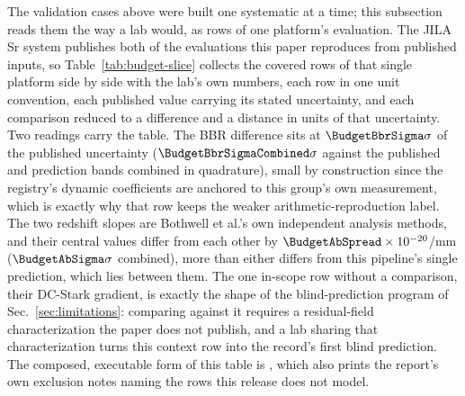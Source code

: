 \documentclass[aps,pra,superscriptaddress,groupedaddress,nofootinbib]{revtex4-2}
\begin{document}
The validation cases above were built one systematic at a time; this
subsection reads them the way a lab would, as rows of one platform's
evaluation. The JILA Sr system publishes both of the evaluations this
paper reproduces from published inputs, so Table~\ref{tab:budget-slice}
collects the covered rows of that single platform side by side with
the lab's own numbers, each row in one unit convention, each published
value carrying its stated uncertainty, and each comparison reduced to
a difference and a distance in units of that uncertainty. Two readings
carry the table. The BBR difference sits at $\BudgetBbrSigma\sigma$ of
the published uncertainty ($\BudgetBbrSigmaCombined\sigma$ against the
published and prediction bands combined in quadrature), small by
construction since the registry's
dynamic coefficients are anchored to this group's own measurement,
which is exactly why that row keeps the weaker arithmetic-reproduction
label. The two redshift slopes are Bothwell et al.'s own independent
analysis methods, and their central values differ from each other by
$\BudgetAbSpread\times10^{-20}$/mm ($\BudgetAbSigma\sigma$ combined),
more than either differs from this pipeline's single prediction, which
lies between them. The one in-scope row without a comparison, their
DC-Stark gradient, is exactly the shape of the blind-prediction
program of Sec.~\ref{sec:limitations}: comparing against it requires a
residual-field characterization the paper does not publish, and a lab
sharing that characterization turns this context row into the record's
first blind prediction. The composed, executable form of this table is
, which also prints the
report's own exclusion notes naming the rows this release does not
model.

\begin{table}[htbp]
\centering
\caption{The covered slice of one platform's published evaluation (the
JILA Sr system: Aeppli et al.~\cite{Aeppli2024}, Bothwell et
al.~\cite{Bothwell2022}), computed from published inputs by the same
case objects the benchmark suite commits. $\sigma$ is the difference in
units of the published value's stated uncertainty, a conservative
convention that ignores this tool's own prediction band; for the BBR
row, the only one where that band is comparable to the published one,
the combined-uncertainty metric reduces the distance to
$\BudgetBbrSigmaCombined\sigma$. The context row is
in-scope physics (Eq.~\eqref{eq:e14b}) awaiting the lab-side field
characterization described in Sec.~\ref{sec:limitations}. Regenerated
by \texttt{paper/figures/table\_budget\_slice.py}; the executable form
is \texttt{notebooks/11\_real\_budget\_slice.ipynb}.}
\label{tab:budget-slice}
\footnotesize

\end{table}
\end{document}

